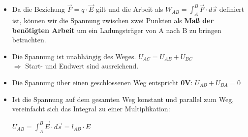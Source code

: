 \begin{itemize}

	\item	Da die Beziehung $\vec{F} =  q \cdot \vec{E} $ gilt und die Arbeit als $ W_{AB} = \int_A^B \vec{F} \cdot d\vec{s}$ definiert ist, können wir die Spannung zwischen zwei Punkten als \textbf{Maß der benötigten Arbeit} um ein Ladungsträger von A nach B zu bringen betrachten.  \\
	\item Die Spannung ist unabhängig des Weges.  $U_{AC} = U_{AB} + U_{BC}$
	      \\ $\Rightarrow$ Start- und Endwert sind ausreichend. \\
	\item Die Spannung über einen geschlossenen Weg entspricht \textbf{0V}: $U_{AB} + U_{BA} = 0$ \\
	\item Ist die Spannung auf dem gesamten Weg konstant und parallel zum Weg, vereinfacht sich das Integral zu einer Multiplikation: \\
	      \begin{center}
	      	$ U_{AB} = \int_{A}^{B} \vec{E}\cdot d\vec{s} = l_{AB} \cdot E$
	      \end{center}
\end{itemize}


\newpage
